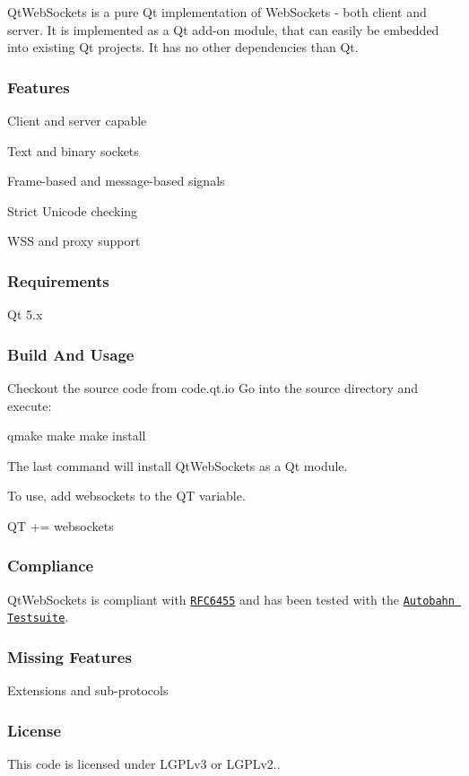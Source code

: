 {\ttfamily Qt\+Web\+Sockets} is a pure Qt implementation of Web\+Sockets -\/ both client and server. It is implemented as a Qt add-\/on module, that can easily be embedded into existing Qt projects. It has no other dependencies than Qt.

\subsubsection*{Features}


\begin{DoxyItemize}
\item Client and server capable
\item Text and binary sockets
\item Frame-\/based and message-\/based signals
\item Strict Unicode checking
\item W\+SS and proxy support
\end{DoxyItemize}

\subsubsection*{Requirements}

Qt 5.\+x

\subsubsection*{Build And Usage}

Checkout the source code from code.\+qt.\+io Go into the source directory and execute\+: \begin{DoxyVerb}qmake
make
make install
\end{DoxyVerb}


The last command will install {\ttfamily Qt\+Web\+Sockets} as a Qt module.

To use, add {\ttfamily websockets} to the QT variable.

{\ttfamily QT += websockets}

\subsubsection*{Compliance}

{\ttfamily Qt\+Web\+Sockets} is compliant with \href{http://datatracker.ietf.org/doc/rfc6455/?include_text=1}{\tt R\+F\+C6455} and has been tested with the \href{http://autobahn.ws/testsuite}{\tt Autobahn Testsuite}.

\subsubsection*{Missing Features}


\begin{DoxyItemize}
\item Extensions and sub-\/protocols
\end{DoxyItemize}

\subsubsection*{License}

This code is licensed under L\+G\+P\+Lv3 or L\+G\+P\+Lv2.. 